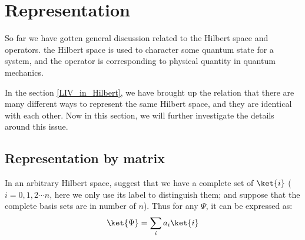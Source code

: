 %

\chapter{Representation}\label{REPRESENTATION:1}
%
%
%
%
So far we have gotten general discussion related to the Hilbert
space and operators. the Hilbert space is used to character some
quantum state for a system, and the operator is corresponding to
physical quantity in quantum mechanics.

In the section \ref{LIV_in_Hilbert}, we have brought up the relation
that there are many different ways to represent the same Hilbert
space, and they are identical with each other. Now in this section,
we will further investigate the details around this issue.


\section{Representation by matrix}\label{REPRESENTATION:2}
%
%
In an arbitrary Hilbert space, suggest that we have a complete set of
$\ket{i}$ ($i=0, 1, 2\cdots n$, here we only use its label to
distinguish them; and suppose that the complete basis sets are in
number of $n$). Thus for any $\Psi$, it can be expressed as:
\begin{equation}\label{REPRESENTATIONeq:1}
\ket{\Psi} = \sum_{i}a_{i}\ket{i}
\end{equation}

